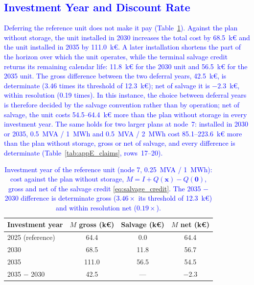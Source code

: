 \documentclass[preprint,12pt]{elsarticle}
\begin{document}
\subsection{\textcolor{blue}{Investment Year and Discount Rate}}
\label{subsec:res_sensitivities}

\textcolor{blue}{
    Deferring the reference unit does not make it pay (Table~\ref{tab:res_year_ladder}). Against the plan without storage, the unit installed in 2030 increases the total cost by 68.5~k\euro{} and the unit installed in 2035 by 111.0~k\euro{}. A later installation shortens the part of the horizon over which the unit operates, while the terminal salvage credit returns its remaining calendar life: 11.8~k\euro{} for the 2030 unit and 56.5~k\euro{} for the 2035 unit. The gross difference between the two deferral years, 42.5~k\euro{}, is determinate (3.46 times its threshold of 12.3~k\euro{}); net of salvage it is $-2.3$~k\euro{}, within resolution (0.19 times). In this instance, the choice between deferral years is therefore decided by the salvage convention rather than by operation; net of salvage, the unit costs 54.5--64.4~k\euro{} more than the plan without storage in every investment year. The same holds for two larger plans at node~7: installed in 2030 or 2035, 0.5~MVA / 1~MWh and 0.5~MVA / 2~MWh cost 85.1--223.6~k\euro{} more than the plan without storage, gross or net of salvage, and every difference is determinate (Table~\ref{tab:appE_claims}, rows~17--20).
}

\begin{table}[htbp!]
    \centering
    \caption{\textcolor{blue}{Investment year of the reference unit (node 7, 0.25~MVA / 1~MWh): cost against the plan without storage, $M = I + Q(\boldsymbol{x}) - Q(\boldsymbol{0})$, gross and net of the salvage credit \eqref{eq:salvage_credit}. The 2035 $-$ 2030 difference is determinate gross ($3.46\times$ its threshold of 12.3~k\euro) and within resolution net ($0.19\times$).}}
    \label{tab:res_year_ladder}
    \scriptsize\setlength{\tabcolsep}{5pt}
    \begin{tabular}{l c c c}
        \toprule
        Investment year & $M$ gross (k\euro) & Salvage (k\euro) & $M$ net (k\euro) \\
        \midrule
        2025 (reference) & 64.4  & 0.0  & 64.4 \\
        2030             & 68.5  & 11.8 & 56.7 \\
        2035             & 111.0 & 56.5 & 54.5 \\
        2035 $-$ 2030    & 42.5  & ---  & $-$2.3 \\
        \bottomrule
    \end{tabular}
\end{table}
\end{document}
